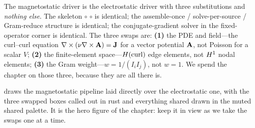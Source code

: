 \begin{keyidea}
The magnetostatic driver is the electrostatic driver with three substitutions and
\emph{nothing else}. The skeleton
 $\circ$  $\circ$  is identical;
the assemble-once / solve-per-source / Gram-reduce structure is identical; the
conjugate-gradient solver in the fixed-operator corner is identical. The three
swaps are: \textbf{(1)} the PDE and field---the curl--curl equation
$\nabla\times(\nu\nabla\times\mathbf{A})=\mathbf{J}$ for a vector potential $\mathbf{A}$, not Poisson for a scalar
$V$; \textbf{(2)} the finite-element space---$H(\mathrm{curl})$ edge elements, not $H^1$
nodal elements; \textbf{(3)} the Gram weight---$w=1/(I_iI_j)$, not $w=1$. We spend
the chapter on those three, because they are all there is.
\end{keyidea}

 draws the magnetostatic pipeline laid directly over the
electrostatic one, with the three swapped boxes called out in rust and everything
shared drawn in the muted shared palette. It is the hero figure of the chapter:
keep it in view as we take the swaps one at a time.

